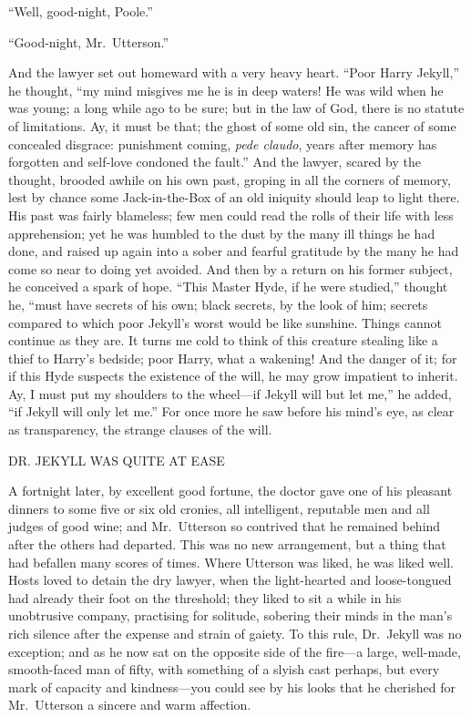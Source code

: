 \documentclass[12pt,openright]{book}
\begin{document}
“Well, good-night, Poole.”

“Good-night, Mr. Utterson.”

And the lawyer set out homeward with a very heavy heart. “Poor Harry Jekyll,” he thought, “my mind misgives me he is in deep waters! He was wild when he was young; a long while ago to be sure; but in the law of God, there is no statute of limitations. Ay, it must be that; the ghost of some old sin, the cancer of some concealed disgrace: punishment coming, \textit{pede claudo}, years after memory has forgotten and self-love condoned the fault.” And the lawyer, scared by the thought, brooded awhile on his own past, groping in all the corners of memory, lest by chance some Jack-in-the-Box of an old iniquity should leap to light there. His past was fairly blameless; few men could read the rolls of their life with less apprehension; yet he was humbled to the dust by the many ill things he had done, and raised up again into a sober and fearful gratitude by the many he had come so near to doing yet avoided. And then by a return on his former subject, he conceived a spark of hope. “This Master Hyde, if he were studied,” thought he, “must have secrets of his own; black secrets, by the look of him; secrets compared to which poor Jekyll’s worst would be like sunshine. Things cannot continue as they are. It turns me cold to think of this creature stealing like a thief to Harry’s bedside; poor Harry, what a wakening! And the danger of it; for if this Hyde suspects the existence of the will, he may grow impatient to inherit. Ay, I must put my shoulders to the wheel—if Jekyll will but let me,” he added, “if Jekyll will only let me.” For once more he saw before his mind’s eye, as clear as transparency, the strange clauses of the will.

DR. JEKYLL WAS QUITE AT EASE

A fortnight later, by excellent good fortune, the doctor gave one of his pleasant dinners to some five or six old cronies, all intelligent, reputable men and all judges of good wine; and Mr. Utterson so contrived that he remained behind after the others had departed. This was no new arrangement, but a thing that had befallen many scores of times. Where Utterson was liked, he was liked well. Hosts loved to detain the dry lawyer, when the light-hearted and loose-tongued had already their foot on the threshold; they liked to sit a while in his unobtrusive company, practising for solitude, sobering their minds in the man’s rich silence after the expense and strain of gaiety. To this rule, Dr. Jekyll was no exception; and as he now sat on the opposite side of the fire—a large, well-made, smooth-faced man of fifty, with something of a slyish cast perhaps, but every mark of capacity and kindness—you could see by his looks that he cherished for Mr. Utterson a sincere and warm affection.
\end{document}
